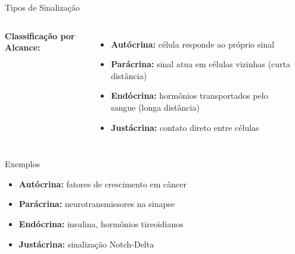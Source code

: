 \begin{frame}{Tipos de Sinalização}
\begin{columns}
\textbf{Classificação por Alcance:}

\begin{itemize}
    \item \textbf{Autócrina:} célula responde ao próprio sinal
    \item \textbf{Parácrina:} sinal atua em células vizinhas (curta distância)
    \item \textbf{Endócrina:} hormônios transportados pelo sangue (longa distância)
    \item \textbf{Justácrina:} contato direto entre células
\end{itemize}

\begin{center}
\end{center}
\end{columns}

\vspace{0.3cm}

\begin{exampleblock}{Exemplos}
\begin{itemize}
    \item \textbf{Autócrina:} fatores de crescimento em câncer
    \item \textbf{Parácrina:} neurotransmissores na sinapse
    \item \textbf{Endócrina:} insulina, hormônios tireoidianos
    \item \textbf{Justácrina:} sinalização Notch-Delta
\end{itemize}
\end{exampleblock}
\end{frame}

